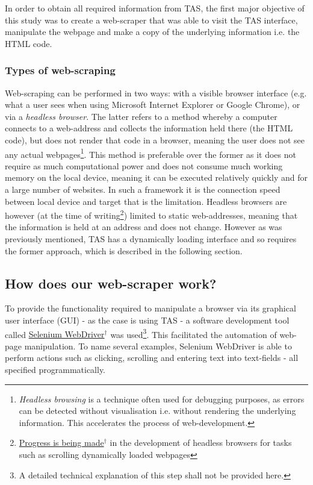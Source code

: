 \documentclass{article}
\begin{document}
In order to obtain all required information from TAS, the first major objective of this study was to create a web-scraper that was able to visit the TAS interface, manipulate the webpage and make a copy of the underlying information i.e. the HTML code.


\subsubsection{Types of web-scraping}
\label{sec-3-1-1}
Web-scraping can be performed in two ways: with a visible browser interface (e.g. what a user sees when using Microsoft Internet Explorer or Google Chrome), or via a \emph{headless browser}. The latter refers to a method whereby a computer connects to a web-address and collects the information held there (the HTML code), but does not render that code in a browser, meaning the user does not see any actual webpages\footnote{\emph{Headless browsing} is a technique often used for debugging purposes, as errors can be detected without visualisation i.e. without rendering the underlying information. This accelerates the process of web-development.}. This method is preferable over the former as it does not require as much computational power and does not consume much working memory on the local device, meaning it can be executed relatively quickly and for a large number of websites. In such a framework it is the connection speed between local device and target that is the limitation. Headless browsers are however (at the time of writing\footnote{\href{http://stackoverflow.com/questions/34942103/headless-endless-scroll-selenium}{Progress is being made$^{\dag{}}$} in the development of headless browsers for tasks such as scrolling dynamically loaded webpages}) limited to static web-addresses, meaning that the information is held at an address and does not change. However as was previously mentioned, TAS has a dynamically loading interface and so requires the former approach, which is described in the following section.


\subsection{How does our web-scraper work?}
\label{sec-3-2}

To provide the functionality required to manipulate a browser via its graphical user interface (GUI) - as the case is using TAS - a software development tool called \href{http://docs.seleniumhq.org/}{Selenium WebDriver$^{\dag{}}$} was used\footnote{A detailed technical explanation of this step shall not be provided here.}. This facilitated the automation of web-page manipulation. To name several examples, Selenium WebDriver is able to perform actions such as clicking, scrolling and entering text into text-fields - all specified programmatically.
\end{document}
